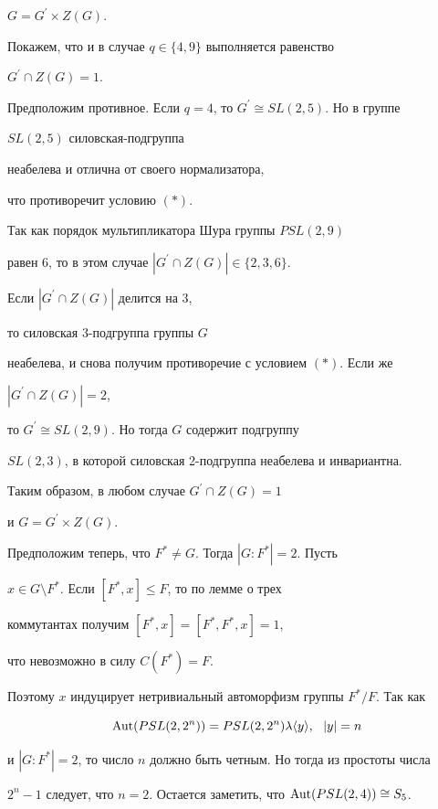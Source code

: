 $G=G^{\prime}\times Z(G)$. 


Покажем, что и в случае $q\in\{4,9\}$ выполняется равенство


$G^{\prime}\cap Z(G)=1$.





Предположим противное. Если $q=4$, то $G^{\prime}\cong SL(2,5)$. Но в группе


$SL(2,5)$ силовская-подгруппа


неабелева и отлична от своего нормализатора,


что противоречит условию $(\ast)$.


Так как порядок мультипликатора Шура группы $PSL(2,9)$


равен 6, то в этом случае $|G^{\prime}\cap Z(G)|\in\{2,3,6\}$.


Если $|G^{\prime}\cap Z(G)|$ делится на 3,


то силовская 3-подгруппа группы $G$


неабелева, и снова получим противоречие с условием $(\ast)$. Если же


$|G^{\prime}\cap Z(G)|=2$,


то $G^{\prime}\cong SL(2,9)$. Но тогда $G$ содержит подгруппу


$SL(2,3)$, в которой силовская 2-подгруппа неабелева и инвариантна.


Таким образом, в любом случае $G^{\prime}\cap Z(G)=1$


и $G=G^{\prime}\times Z(G)$.





Предположим теперь, что $F^*\ne G$. Тогда $|G:F^*|=2$. Пусть


$x\in G\setminus F^*$. Если $[F^*,x]\le F$, то по лемме о трех


коммутантах получим $[F^*,x]=[F^*,F^*,x]=1$,


что невозможно в силу $C(F^*)=F$.


Поэтому $x$ индуцирует нетривиальный автоморфизм группы $F^*/F$. Так как


$$


\Aut(PSL(2,2^n))=PSL(2,2^n)\lambda \ls y \ps,\ \ |y|=n


$$


и $|G:F^*|=2$, то число $n$ должно быть четным. Но тогда из простоты числа


$2^n-1$ следует, что $n=2$. Остается заметить, что $\operatorname{Aut}(PSL(2,4))\cong S_5$.


